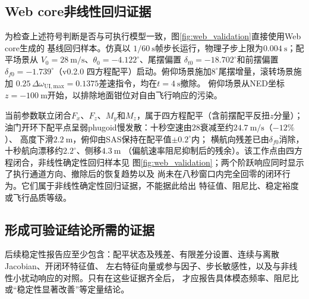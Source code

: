 

\subsection{Web core非线性回归证据}

为检查上述符号判断是否与可执行模型一致，图\ref{fig:web_validation}直接使用Web core生成的
基线回归样本。仿真以
$1/60\ \mathrm{s}$帧步长运行，物理子步上限为$0.004\ \mathrm{s}$；配平场景从
$V_0=28\ \mathrm{m/s}$、$\theta_0=-4.122^\circ$、尾摆偏置
$\delta_{t0}=-18.702^\circ$和前摆偏置$\delta_{f0}=-1.739^\circ$（v0.2.0 四方程配平）启动。俯仰场景施加$8^\circ$尾摆增量，滚转场景施加
$0.25\,\Delta\omega_{\mathrm{UI,max}}=0.1375$差速指令，均在$t=4\ \mathrm{s}$撤除。
俯仰场景从NED坐标$z=-100\ \mathrm{m}$开始，以排除地面钳位对自由飞行响应的污染。

当前参数联立闭合$F_x$、$F_z$、$M_y$和$M_z$，属于四方程配平（含前摆配平反扭$z$分量）；
油门开环下配平点呈弱phugoid慢发散：十秒空速由$28$衰减至约$24.7\ \mathrm{m/s}$（$-12\%$）、
高度下滑$2.2\ \mathrm{m}$，俯仰由SAS保持在配平值$\pm0.2^\circ$内；
横航向残差已由$\delta_{f0}$消除，十秒航向漂移约$2.2^\circ$、侧移$4.3\ \mathrm{m}$
（偏航速率阻尼抑制后的残余）。该工作点由四方程闭合，非线性确定性回归样本见
图\ref{fig:web_validation}；两个阶跃响应同时显示了执行通道方向、撤除后的恢复趋势以及
尚未在八秒窗口内完全回零的闭环行为。它们属于非线性确定性回归证据，不能据此给出
特征值、阻尼比、稳定裕度或飞行品质等级。



\subsection{形成可验证结论所需的证据}

后续稳定性报告应至少包含：配平状态及残差、有限差分设置、连续与离散Jacobian、开闭环特征值、
左右特征向量或参与因子、步长敏感性，以及与非线性小扰动响应的对照。只有在这些证据齐全后，
才应报告具体模态频率、阻尼比或“稳定性显著改善”等定量结论。
